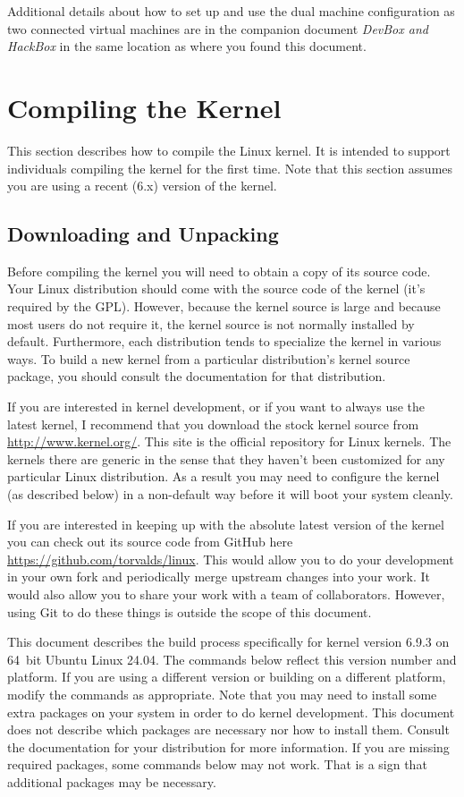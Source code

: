 \documentclass{article}
\begin{document}
Additional details about how to set up and use the dual machine configuration as two connected
virtual machines are in the companion document \textit{DevBox and HackBox} in the same location
as where you found this document.

\section{Compiling the Kernel}

This section describes how to compile the Linux kernel. It is intended to support individuals
compiling the kernel for the first time. Note that this section assumes you are using a recent
(6.x) version of the kernel.

\subsection{Downloading and Unpacking}

Before compiling the kernel you will need to obtain a copy of its source code. Your Linux
distribution should come with the source code of the kernel (it's required by the GPL). However,
because the kernel source is large and because most users do not require it, the kernel source
is not normally installed by default. Furthermore, each distribution tends to specialize the
kernel in various ways. To build a new kernel from a particular distribution's kernel source
package, you should consult the documentation for that distribution.

If you are interested in kernel development, or if you want to always use the latest kernel, I
recommend that you download the stock kernel source from \url{http://www.kernel.org/}. This site
is the official repository for Linux kernels. The kernels there are generic in the sense that
they haven't been customized for any particular Linux distribution. As a result you may need to
configure the kernel (as described below) in a non-default way before it will boot your system
cleanly.

If you are interested in keeping up with the absolute latest version of the kernel you can check
out its source code from GitHub here \url{https://github.com/torvalds/linux}. This would allow
you to do your development in your own fork and periodically merge upstream changes into your
work. It would also allow you to share your work with a team of collaborators. However, using
Git to do these things is outside the scope of this document.

This document describes the build process specifically for kernel version 6.9.3 on 64~bit Ubuntu
Linux 24.04. The commands below reflect this version number and platform. If you are using a
different version or building on a different platform, modify the commands as appropriate. Note
that you may need to install some extra packages on your system in order to do kernel
development. This document does not describe which packages are necessary nor how to install
them. Consult the documentation for your distribution for more information. If you are missing
required packages, some commands below may not work. That is a sign that additional packages may
be necessary.
\end{document}
